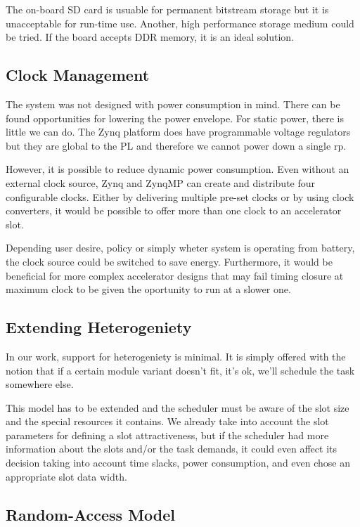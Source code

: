 The on-board SD card is usuable for permanent bitstream storage but it is unacceptable for run-time use.
Another, high performance storage medium could be tried. If the board accepts DDR memory, it is an ideal solution.


\subsection{Clock Management}

The system was not designed with power consumption in mind. There can be found opportunities for lowering the power envelope.
For static power, there is little we can do. The Zynq platform does have programmable voltage regulators but they are global to the PL
and therefore we cannot power down a single \gls{rp}.

However, it is possible to reduce dynamic power consumption. Even without an external clock source, Zynq and ZynqMP can create and distribute
four configurable clocks. Either by delivering multiple pre-set clocks or by using clock converters, it would be possible to offer more than
one clock to an accelerator slot. 

Depending user desire, policy or simply wheter system is operating from battery, the clock source could be switched to save energy.
Furthermore, it would be beneficial for more complex accelerator designs that may fail timing closure at maximum clock
to be given the oportunity to run at a slower one.

\subsection{Extending Heterogeniety}

In our work, support for heterogeniety is minimal. 
It is simply offered with the notion that if a certain module variant doesn't fit, it's ok, we'll schedule the task somewhere else.

This model has to be extended and the scheduler must be aware of the slot size and the special resources it contains.
We already take into account the slot parameters for defining a slot attractiveness, but if the scheduler had more information
about the slots and/or the task demands, it could even affect its decision taking into account time slacks, power consumption,
and even chose an appropriate slot data width.


\subsection{Random-Access Model}

